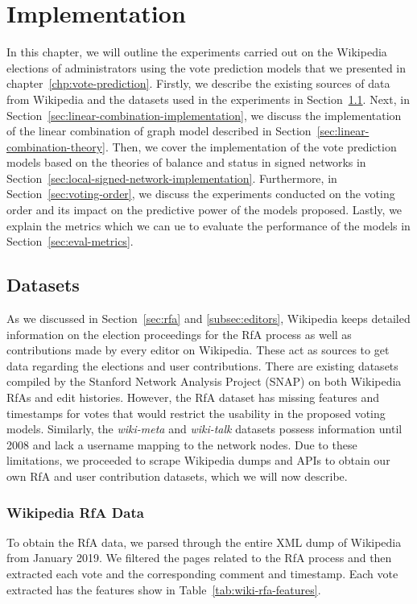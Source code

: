\chapter{Implementation}
\label{chp:implementation}
In this chapter, we will outline the experiments carried out on the Wikipedia elections of administrators using the vote prediction models that we presented in chapter~\ref{chp:vote-prediction}.
Firstly, we describe the existing sources of data from Wikipedia and the datasets used in the experiments in Section~\ref{sec:datasets}.
Next, in Section~\ref{sec:linear-combination-implementation}, we discuss the implementation of the linear combination of graph model described in Section~\ref{sec:linear-combination-theory}.
Then, we cover the implementation of the vote prediction models based on the theories of balance and status in signed networks in Section~\ref{sec:local-signed-network-implementation}.
Furthermore, in Section~\ref{sec:voting-order}, we discuss the experiments conducted on the voting order and its impact on the predictive power of the models proposed.
Lastly, we explain the metrics which we can ue to evaluate the performance of the models in Section~\ref{sec:eval-metrics}.


\section{Datasets}
\label{sec:datasets}
As we discussed in Section~\ref{sec:rfa} and \ref{subsec:editors}, Wikipedia keeps detailed information on the election proceedings for the RfA process as well as contributions made by every editor on Wikipedia.
These act as sources to get data regarding the elections and user contributions. There are existing datasets compiled by the Stanford Network Analysis Project (SNAP) \cite{snapnets} on both Wikipedia RfAs and edit histories.
However, the RfA dataset has missing features and timestamps for votes that would restrict the usability in the proposed voting models.
Similarly, the \textit{wiki-meta} and \textit{wiki-talk} datasets possess information until 2008 and lack a username mapping to the network nodes.
Due to these limitations, we proceeded to scrape Wikipedia dumps and APIs to obtain our own RfA and user contribution datasets, which we will now describe.

\subsection{Wikipedia RfA Data}
To obtain the RfA data, we parsed through the entire XML dump of Wikipedia from January 2019.
We filtered the pages related to the RfA process and then extracted each vote and the corresponding comment and timestamp.
Each vote extracted has the features show in Table~\ref{tab:wiki-rfa-features}.

